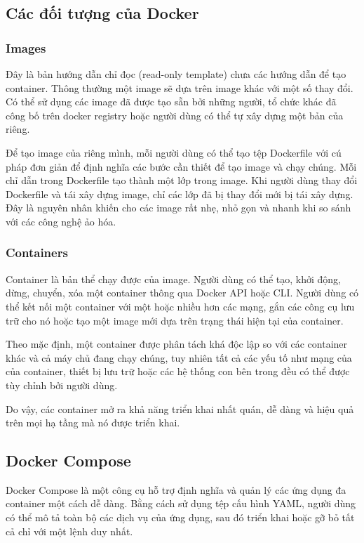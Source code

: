 \subsection{Các đối tượng của Docker}

\subsubsection{Images}

Đây là bản hướng dẫn chỉ đọc (read-only template) chưa các hướng dẫn để tạo container. Thông thường một image sẽ dựa trên image khác với một số thay đổi. Có thể sử dụng các image đã được tạo sẵn bởi những người, tổ chức khác đã công bố trên docker registry hoặc người dùng có thể tự xây dựng một bản của riêng.

Để tạo image của riêng mình, mỗi người dùng có thể tạo tệp Dockerfile với cú pháp đơn giản để định nghĩa các bước cần thiết để tạo image và chạy chúng. Mỗi chỉ dẫn trong Dockerfile tạo thành một lớp trong image. Khi người dùng thay đổi Dockerfile và tái xây dựng image, chỉ các lớp đã bị thay đổi mới bị tái xây dựng. Đây là nguyên nhân khiến cho các image rất nhẹ, nhỏ gọn và nhanh khi so sánh với các công nghệ ảo hóa.

\subsubsection{Containers}

Container là bản thể chạy được của image. Người dùng có thể tạo, khởi động, dừng, chuyển, xóa một container thông qua Docker API hoặc CLI. Người dùng có thể kết nối một container với một hoặc nhiều hơn các mạng, gắn các công cụ lưu trữ cho nó hoặc tạo một image mới dựa trên trạng thái hiện tại của container.

Theo mặc định, một container được phân tách khá độc lập so với các container khác và cả máy chủ đang chạy chúng, tuy nhiên tất cả các yếu tố như mạng của của container, thiết bị lưu trữ hoặc các hệ thống con bên trong đều có thể được tùy chỉnh bởi người dùng.

Do vậy, các container mở ra khả năng triển khai nhất quán, dễ dàng và hiệu quả trên mọi hạ tầng mà nó được triển khai.

\subsection{Docker Compose}

Docker Compose là một công cụ hỗ trợ định nghĩa và quản lý các ứng dụng đa container một cách dễ dàng. Bằng cách sử dụng tệp cấu hình YAML, người dùng có thể mô tả toàn bộ các dịch vụ của ứng dụng, sau đó triển khai hoặc gỡ bỏ tất cả chỉ với một lệnh duy nhất.

